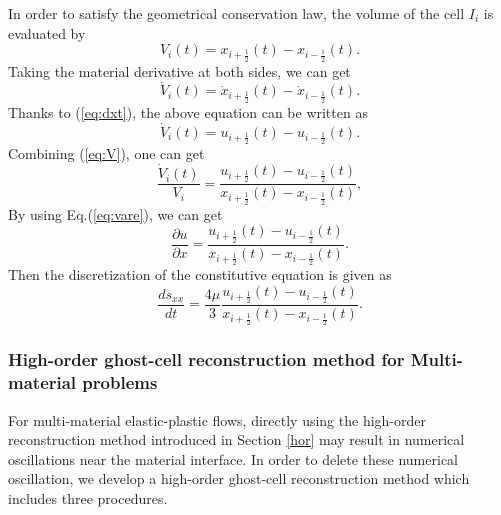 \documentclass[review]{elsarticle}
\begin{document}
In order to satisfy the geometrical conservation law, the volume of the cell $I_i$ is evaluated by
\begin{equation}\label{eq:V}
  V_i(t) = x_{i+\frac{1}{2}}(t) - x_{i-\frac{1}{2}}(t).
\end{equation}
Taking the material derivative at both sides, we can get
\begin{equation}\label{eq:dotV}
  \dot{V}_i(t) = \dot{x}_{i+\frac{1}{2}}(t) - \dot{x}_{i-\frac{1}{2}}(t).
\end{equation}
Thanks to (\ref{eq:dxt}), the above equation can be written as
\begin{equation}\label{eq:dotV}
  \dot{V}_i(t) = u_{i+\frac{1}{2}}(t) - u_{i-\frac{1}{2}}(t).
\end{equation}
Combining (\ref{eq:V}), one can get
\begin{equation}
  \frac{\dot{V}_i(t)}{V_i} =\frac{ u_{i+\frac{1}{2}}(t) - u_{i-\frac{1}{2}}(t)}{ x_{i+\frac{1}{2}}(t) - x_{i-\frac{1}{2}}(t)},
\end{equation}
By using Eq.(\ref{eq:vare}), we can get
\begin{equation}
  \frac{\partial u}{\partial x} =\frac{ u_{i+\frac{1}{2}}(t) - u_{i-\frac{1}{2}}(t)}{ x_{i+\frac{1}{2}}(t) - x_{i-\frac{1}{2}}(t)}.
\end{equation}
Then  the  discretization of the constitutive equation is given as
\begin{equation}\label{eq:semSxx}
  \frac{d s_{xx}}{dt } =\frac{4\mu}{3} \frac{ u_{i+\frac{1}{2}}(t) - u_{i-\frac{1}{2}}(t)}{ x_{i+\frac{1}{2}}(t) - x_{i-\frac{1}{2}}(t)}.
\end{equation}


\subsubsection{High-order ghost-cell reconstruction method for Multi-material problems} \label{sec:ghostcell}

For multi-material elastic-plastic flows, directly using the high-order reconstruction method introduced in  Section \ref{hor} may result in numerical oscillations near the material interface. In order to delete these numerical oscillation, we develop a high-order ghost-cell reconstruction method which includes three procedures.
\end{document}
